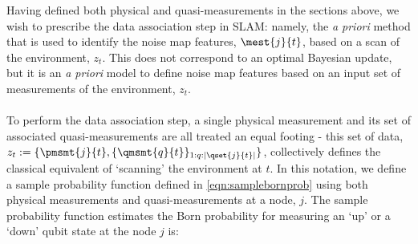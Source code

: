 Having defined both physical and quasi-measurements in the sections above, we wish to prescribe the data association step in SLAM: namely, the \textit{a priori} method that is used to identify the noise map features, $\mest{j}{t}$, based on a scan of the environment, $z_t$.  This does not correspond to an optimal Bayesian update, but it is an \textit{a priori} model to define noise map features based on an input set of measurements of the environment, $z_t$. \\
\\
To perform the data association step, a single physical measurement and its set of associated quasi-measurements are all treated an equal footing - this set of data, $z_t := \{\pmsmt{j}{t}, \{ \qmsmt{q}{t} \}_{1:q:|\qset{j}{t}|}\}$, collectively defines the classical equivalent of `scanning' the environment at $t$. In this notation, we define  a sample probability function defined in \cref{eqn:samplebornprob} using both physical measurements and quasi-measurements at a node, $j$. The sample probability function estimates the Born probability for measuring an `up' or a `down' qubit state at the node $j$ is:
